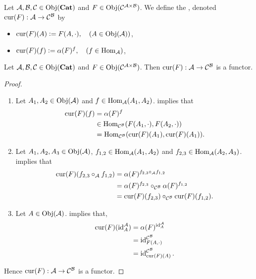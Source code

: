 \documentclass{book}
\begin{document}
	\begin{defn} 
		Let $\MA, \MB, \MC \in \Obj(\bCat)$ and $F \in \Obj(\MC^{\MA \times \MB})$. We define the , denoted $\cur(F): \MA \rightarrow \MC^{\MB}$ by 
		\begin{itemize}
			\item $\cur(F)(A) \defeq F(A, \cdot), \quad (A \in \Obj(\MA))$,
			\item $\cur(F)(f) \defeq \al(F)^f, \quad (f \in \Hom_{\MA})$,
		\end{itemize} 
	\end{defn}
	
	\begin{ex} 
		Let $\MA, \MB, \MC \in \Obj(\bCat)$ and $F \in \Obj(\MC^{\MA \times \MB})$. Then $\cur(F): \MA \rightarrow \MC^{\MB}$ is a functor.
	\end{ex}
	
	\begin{proof}\
		\begin{enumerate}
			\item Let $A_1, A_2 \in \Obj(\MA)$ and $f \in \Hom_{\MA}(A_1, A_2)$.  implies that 
			\begin{align*}
				\cur(F)(f)
				& = \al(F)^f \\
				& \in \Hom_{\MC^{\MB}}(F(A_1, \cdot), F(A_2, \cdot)) \\
				& = \Hom_{\MC^{\MB}}(\cur(F)(A_1), \cur(F)(A_1)).
			\end{align*}
			\item Let $A_1, A_2, A_3 \in \Obj(\MA)$, $f_{1,2} \in \Hom_{\MA}(A_1, A_2)$ and $f_{2,3} \in \Hom_{\MA}(A_2, A_3)$.  implies that 
			\begin{align*}
				\cur(F)(f_{2,3} \circ_{\MA} f_{1,2})
				& = \al(F)^{f_{2,3} \circ_{\MA} f_{1,2}} \\
				& = \al(F)^{f_{2,3}} \circ_{\MC^{\MB}} \al(F)^{f_{1,2}} \\
				& = \cur(F)(f_{2,3}) \circ_{\MC^{\MB}} \cur(F)(f_{1,2}).
			\end{align*} 
			\item Let $A \in \Obj(\MA)$.  implies that,
			\begin{align*}
				\cur(F)(\id_A^{\MA})
				& = \al(F)^{\id_A^{\MA}} \\
				& = \id_{F(A, \cdot)}^{\MC^{\MB}} \\
				& = \id_{\cur(F)(A)}^{\MC^{\MB}}.
			\end{align*}
		\end{enumerate}
		Hence $\cur(F):\MA \rightarrow \MC^{\MB}$ is a functor. 
	\end{proof}
	
\end{document}
